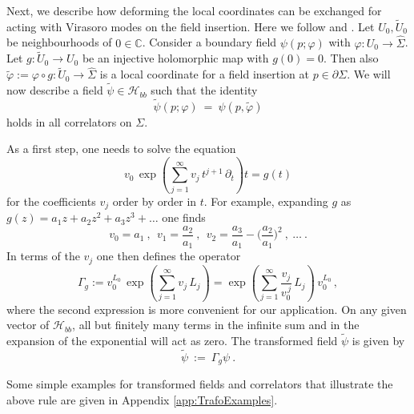 \documentclass[11pt,a4paper]{article}
\numberwithin{equation}{section}
\begin{document}
Next, we describe how deforming the local coordinates can be exchanged for acting with Virasoro modes on the field insertion. Here we follow \cite[Sec.\,5.4]{Frenkel:2004jn} and \cite[Sec.\,5.1]{Fuchs:2004xi}. Let $U_0, \tilde U_0$ be neighbourhoods of $0 \in \mathbb{C}$.    
Consider a boundary field $\psi(p;\varphi)$ with $\varphi : U_0 \to \widehat\Sigma$. Let $g : \tilde U_0 \to U_0$ be an injective holomorphic map with $g(0)=0$. Then also $\tilde\varphi :=  \varphi \circ g : \tilde U_0 \to \widehat\Sigma$ is a local coordinate for a field insertion at $p \in \partial\Sigma$. We will now describe a field $\tilde\psi \in \mathcal{H}_{bb}$ such that the identity 
\begin{equation}\label{eq:change-coord-for-Vir}
	\tilde\psi(p;\varphi) ~=~ \psi(p,\tilde\varphi)
\end{equation}
holds in all correlators on $\Sigma$.

As a first step, one needs to solve the equation
\begin{equation}\label{eq:vi-defining-relation}
    v_0 \,\exp\!\left(\sum_{j=1}^\infty v_j \,t^{j+1}\,\partial_t\right)t = g(t)
\end{equation}
for the coefficients $v_j$ order by order in $t$. For example, expanding $g$ as $g(z) = a_1 z + a_2 z^2 + a_3 z^3 + \dots$ one finds
%
\begin{equation}\label{eq:v0v1v2}
    v_0 = a_1 
    ~,~~
    v_1 = \frac{a_2}{a_1}
    ~,~~
    v_2 = \frac{a_3}{a_1} -\Big( \frac{a_2}{a_1} \Big)^2 
    ~,~
    \dots ~.
\end{equation}
%
In terms of the $v_j$ one then defines the operator
%
\begin{equation}\label{eq:Gamma}
    \Gamma_g := 
    v_0^{L_0} \,\exp\!\left(\sum_{j=1}^\infty v_j \,L_j\right)
    =
    \exp\!\left(\sum_{j=1}^\infty \frac{v_j}{v_0^{\,j}}\,L_j\right)\,v_0^{L_0} \,,
\end{equation}
%
where the second expression is more convenient for our application.
On any given vector of $\mathcal{H}_{bb}$, all but finitely many terms in the infinite sum and in the expansion of the exponential will act as zero.
The transformed field $\tilde\psi$ is given by
\begin{equation}\label{eq:FieldTrafo}
	\tilde\psi ~:=~ \Gamma_g \psi ~.
\end{equation}

\noindent 
Some simple examples for transformed fields and correlators that illustrate the above rule are given in Appendix \ref{app:TrafoExamples}. 
\end{document}
